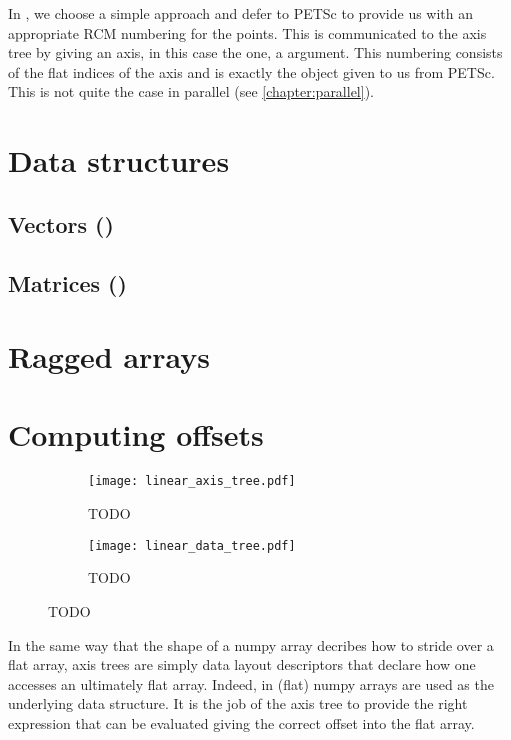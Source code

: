\documentclass[thesis]{subfiles}
\begin{document}
In , we choose a simple approach and defer to PETSc to provide us with an appropriate RCM numbering for the points.
This is communicated to the axis tree by giving an axis, in this case the  one, a  argument.
This numbering consists of the flat indices of the axis and is exactly the object given to us from PETSc.
This is not quite the case in parallel (see \cref{chapter:parallel}).

\section{Data structures}
\label{sec:data_structures}

\subsection{Vectors ()}

\subsection{Matrices ()}

\section{Ragged arrays}


\section{Computing offsets}

\begin{figure}
  \centering
  \begin{subfigure}{.3\textwidth}
    \centering
    \texttt{[image: linear\_axis\_tree.pdf]}
    \caption{TODO}
    \label{fig:linear_axis_tree}
  \end{subfigure}
  \begin{subfigure}{.58\textwidth}
    \centering
    \texttt{[image: linear\_data\_tree.pdf]}
    \caption{TODO}
    \label{fig:linear_data_tree}
  \end{subfigure}
  \caption{TODO}
  \label{fig:linear_axis_data_tree}
\end{figure}

In the same way that the shape of a numpy array decribes how to stride over a flat array, axis trees are simply data layout descriptors that declare how one accesses an ultimately flat array.
Indeed, in  (flat) numpy arrays are used as the underlying data structure.
It is the job of the axis tree to provide the right expression that can be evaluated giving the correct offset into the flat array.
\end{document}
